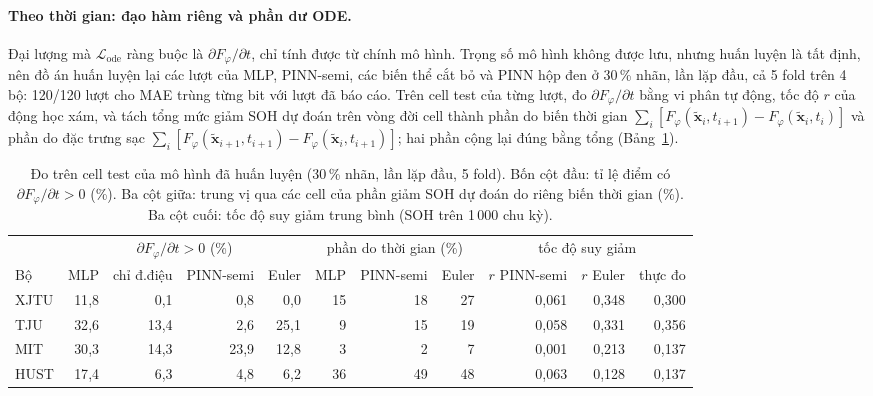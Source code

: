 \documentclass[12pt,a4paper,oneside]{report}
\theoremstyle{plain}
\theoremstyle{definition}
\begin{document}
\paragraph{Theo thời gian: đạo hàm riêng và phần dư ODE.} Đại lượng mà $\mathcal{L}_\text{ode}$ ràng buộc là
$\partial F_\varphi/\partial t$, chỉ tính được từ chính mô hình. Trọng số mô hình không được lưu, nhưng huấn luyện
là tất định, nên đồ án huấn luyện lại các lượt của MLP, PINN-semi, các biến thể cắt bỏ và PINN hộp đen ở 30\,\% nhãn,
lần lặp đầu, cả 5 fold trên 4 bộ: 120/120 lượt cho MAE trùng từng bit với lượt đã báo cáo. Trên cell test của
từng lượt, đo $\partial F_\varphi/\partial t$ bằng vi phân tự động, tốc độ $r$ của động học xám, và tách tổng mức
giảm SOH dự đoán trên vòng đời cell thành phần do biến thời gian
$\sum_i [F_\varphi(\tilde{\mathbf{x}}_i, t_{i+1}) - F_\varphi(\tilde{\mathbf{x}}_i, t_i)]$ và phần do đặc trưng sạc
$\sum_i [F_\varphi(\tilde{\mathbf{x}}_{i+1}, t_{i+1}) - F_\varphi(\tilde{\mathbf{x}}_i, t_{i+1})]$; hai phần cộng lại
đúng bằng tổng (Bảng~\ref{tab:physcheck}).

\begin{table}[!htbp]\centering\footnotesize
\caption[Kiểm tra phần vật lý trên cell test]{Đo trên cell test của mô hình đã huấn luyện (30\,\% nhãn, lần lặp đầu, 5 fold). Bốn cột đầu: tỉ lệ điểm có $\partial F_\varphi/\partial t > 0$ (\%). Ba cột giữa: trung vị qua các cell của phần giảm SOH dự đoán do riêng biến thời gian (\%). Ba cột cuối: tốc độ suy giảm trung bình (SOH trên 1\,000 chu kỳ).}\label{tab:physcheck}
\begin{adjustbox}{max width=\textwidth}\begin{tabular}{lrrrrrrrrrr}\toprule
 & \multicolumn{4}{c}{$\partial F_\varphi/\partial t > 0$ (\%)} & \multicolumn{3}{c}{phần do thời gian (\%)} & \multicolumn{3}{c}{tốc độ suy giảm} \\ \cmidrule(lr){2-5}\cmidrule(lr){6-8}\cmidrule(lr){9-11}
Bộ & MLP & chỉ đ.điệu & PINN-semi & Euler & MLP & PINN-semi & Euler & $r$ PINN-semi & $r$ Euler & thực đo \\\midrule
XJTU & 11{,}8 & 0{,}1 & 0{,}8 & 0{,}0 & 15 & 18 & 27 & 0{,}061 & 0{,}348 & 0{,}300 \\
TJU & 32{,}6 & 13{,}4 & 2{,}6 & 25{,}1 & 9 & 15 & 19 & 0{,}058 & 0{,}331 & 0{,}356 \\
MIT & 30{,}3 & 14{,}3 & 23{,}9 & 12{,}8 & 3 & 2 & 7 & 0{,}001 & 0{,}213 & 0{,}137 \\
HUST & 17{,}4 & 6{,}3 & 4{,}8 & 6{,}2 & 36 & 49 & 48 & 0{,}063 & 0{,}128 & 0{,}137 \\
\bottomrule\end{tabular}\end{adjustbox}\end{table}
\end{document}
